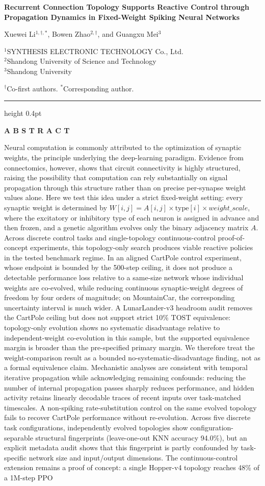 \documentclass[10pt]{article}
\renewenvironment{abstract}{%
  \vspace{0.15em}
  \begin{center}\small\bfseries A B S T R A C T\end{center}
  \vspace{-0.9em}
  \small\noindent
}{\par\vspace{0.55em}}
\newcommand{\compacttitle}{%
  \vspace*{-1.25em}
  \begin{flushleft}
  {\LARGE\bfseries Recurrent Connection Topology Supports Reactive Control through Propagation Dynamics in Fixed-Weight Spiking Neural Networks\par}
  \vspace{0.55em}
  {\normalsize Xuewei Li$^{1,\dagger,*}$, Bowen Zhao$^{2,\dagger}$, and Guangxu Mei$^{3}$\par}
  \vspace{0.2em}
  {\small $^1$SYNTHESIS ELECTRONIC TECHNOLOGY Co., Ltd.\\[-0.03em]
  $^2$Shandong University of Science and Technology\\[-0.03em]
  $^3$Shandong University\par}
  \vspace{0.15em}
  {\small $^\dagger$Co-first authors. \quad $^*$Corresponding author.\par}
  \end{flushleft}
  \vspace{0.35em}
  \hrule height 0.4pt
  \vspace{0.65em}
}
\begin{document}
\compacttitle
\begin{abstract}
Neural computation is commonly attributed to the optimization of synaptic
weights, the principle underlying the deep-learning paradigm. Evidence from
connectomics, however, shows that circuit connectivity is highly structured,
raising the possibility that computation can rely substantially on signal
propagation through this structure rather than on precise per-synapse weight
values alone. Here we test this
idea under a strict fixed-weight setting: every synaptic weight is determined by
$W[i,j]=A[i,j]\times\text{type}[i]\times\mathit{weight\_scale}$, where the
excitatory or inhibitory type of each neuron is assigned in advance and then
frozen, and a genetic algorithm evolves only the binary adjacency matrix $A$.
Across discrete control tasks and single-topology continuous-control
proof-of-concept experiments, this topology-only search produces viable
reactive policies in the tested benchmark regime. In an aligned CartPole
control experiment, whose endpoint is bounded by the 500-step ceiling, it does
not produce a detectable performance loss relative to a same-size network whose
individual weights are co-evolved, while reducing continuous synaptic-weight
degrees of freedom by four orders of magnitude; on MountainCar, the
corresponding uncertainty interval is much wider. A LunarLander-v3 headroom
audit removes the CartPole ceiling but does not support strict 10\% TOST
equivalence: topology-only evolution shows no systematic disadvantage relative
to independent-weight co-evolution in this sample, but the supported equivalence
margin is broader than the pre-specified primary margin. We therefore treat the
weight-comparison result as a bounded no-systematic-disadvantage finding, not as
a formal equivalence claim. Mechanistic analyses are consistent with temporal
iterative propagation while acknowledging remaining confounds: reducing the
number of internal propagation passes sharply reduces performance, and hidden
activity retains linearly decodable traces of recent inputs over task-matched
timescales. A
non-spiking rate-substitution control on the same evolved topology fails to
recover CartPole performance without re-evolution. Across five discrete task
configurations, independently evolved topologies show configuration-separable
structural fingerprints (leave-one-out KNN accuracy 94.0\%), but an explicit
metadata audit shows that this fingerprint is partly confounded by task-specific
network size and input/output dimensions. The continuous-control extension remains a
proof of concept: a single Hopper-v4 topology reaches 48\% of a 1M-step PPO

\end{abstract}
\end{document}
